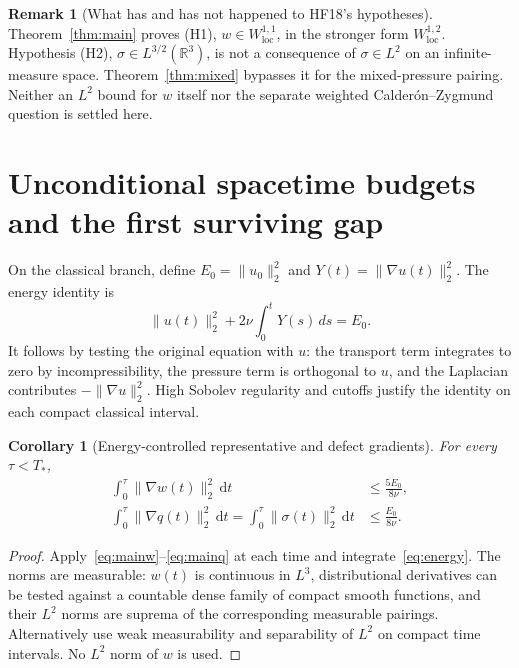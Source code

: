 \documentclass[11pt,a4paper]{article}
\newtheorem{corollary}[theorem]{Corollary}
\theoremstyle{definition}
\newtheorem{remark}[theorem]{Remark}
\newcommand{\R}{\mathbb R}
\newcommand{\dt}{\,\mathrm dt}
\begin{document}
\begin{remark}[What has and has not happened to HF18's hypotheses]
Theorem~\ref{thm:main} proves (H1), $w\in W^{1,1}_{\mathrm{loc}}$, in the stronger form $W^{1,2}_{\mathrm{loc}}$. Hypothesis (H2), $\sigma\in L^{3/2}(\R^3)$, is not a consequence of $\sigma\in L^2$ on an infinite-measure space. Theorem~\ref{thm:mixed} bypasses it for the mixed-pressure pairing. Neither an $L^2$ bound for $w$ itself nor the separate weighted Calder\'on--Zygmund question is settled here.
\end{remark}

\section{Unconditional spacetime budgets and the first surviving gap}\label{sec:budget}
On the classical branch, define $E_0=\|u_0\|_2^2$ and $Y(t)=\|\nabla u(t)\|_2^2$. The energy identity is
\begin{equation}\label{eq:energy}
 \|u(t)\|_2^2+2\nu\int_0^tY(s)\,ds=E_0.
\end{equation}
It follows by testing the original equation with $u$: the transport term integrates to zero by incompressibility, the pressure term is orthogonal to $u$, and the Laplacian contributes $-\|\nabla u\|_2^2$. High Sobolev regularity and cutoffs justify the identity on each compact classical interval.

\begin{corollary}[Energy-controlled representative and defect gradients]\label{cor:budgets}
For every $\tau<T_*$,
\begin{align}
 \int_0^\tau\|\nabla w(t)\|_2^2\dt&\le\frac{5E_0}{8\nu},\label{eq:wbudget}\\
 \int_0^\tau\|\nabla q(t)\|_2^2\dt
 =\int_0^\tau\|\sigma(t)\|_2^2\dt&\le\frac{E_0}{8\nu}.\label{eq:sigmabudget}
\end{align}
\end{corollary}
\begin{proof}
Apply~\eqref{eq:mainw}--\eqref{eq:mainq} at each time and integrate~\eqref{eq:energy}. The norms are measurable: $w(t)$ is continuous in $L^3$, distributional derivatives can be tested against a countable dense family of compact smooth functions, and their $L^2$ norms are suprema of the corresponding measurable pairings. Alternatively use weak measurability and separability of $L^2$ on compact time intervals. No $L^2$ norm of $w$ is used.
\end{proof}
\end{document}
